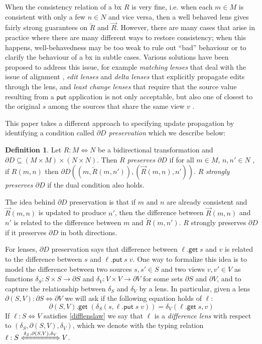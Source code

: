 \documentclass[acmsmall,review,anonymous]{acmart}\settopmatter{printfolios=true,printccs=false,printacmref=false}
\theoremstyle{definition}
\newtheorem{definition}{Definition}
\newcommand{\kw}[1]{\ensuremath{\mathsf{#1}}\xspace}
\newcommand{\get}{\ensuremath{\kw{get}}\xspace}
\newcommand{\pput}{\ensuremath{\kw{put}}\xspace}
\begin{document}
When the consistency relation of a bx $R$ is very fine, i.e. when each $m \in M$
is consistent with only a few $n \in N$ and vice versa, then a well behaved lens
gives fairly strong guarantees on $\overleftarrow{R}$ and $\overrightarrow{R}$.
However, there are many cases that arise in practice where there are many
different ways to restore consistency; when this happens, well-behavedness may
be too weak to rule out ``bad'' behaviour or to clarify the behaviour of a bx in
subtle cases. Various solutions have been proposed to address this issue, for
example {\em matching lenses} that deal with the issue of alignment
\cite{barbosa2010matching}, {\em edit lenses} \cite{hofmann2012edit} and {\em
delta lenses} \cite{diskin2011asymmetric,diskin2011state,pacheco2012delta}
that explicitly propagate edits through the lens, and {\em least change
lenses} that require that the source value resulting from a \pput application
is not only acceptable, but also one of closest to the original $s$ among the
sources that share the same view $v$ \cite{macedo2013composing}.

This paper takes a different approach to specifying update propagation by
identifying a condition called {\em $\partial D$ preservation} which we describe
below:
\begin{definition}
Let $R : M \Leftrightarrow N$ be a bidirectional transformation and $\partial D
\subseteq (M \times M) \times (N \times N)$. Then $R$ {\em preserves $\partial
D$} if for all $m \in M$, $n, n' \in N$ , if $R(m, n)$ then $\partial D((m,
\overleftarrow{R}(m, n')), (\overrightarrow{R}(m, n), n'))$. $R$ {\em
strongly preserves $\partial D$} if the dual condition also holds.
\end{definition}
\noindent The idea behind $\partial D$ preservation is that if $m$ and $n$ are
already consistent and $\overrightarrow{R}(m,n)$ is updated to produce $n'$,
then the difference between $\overrightarrow{R}(m,n)$ and $n'$ is related
to the difference between $m$ and $\overleftarrow{R}(m,n')$. $R$
strongly preserves $\partial D$ if it preserves $\partial D$ in both directions.

For lenses, $\partial D$ preservation says that difference between $\ell.\get \;
s$ and $v$ is related to the difference between $s$ and $\ell.\pput \; s \;
v$. One way to formalize this idea is to model the difference between two sources $s, s'
\in S$ and two views $v, v' \in V$ as functions $\delta_S : S \times S
\longrightarrow \partial S$ and $\delta_V : V \times V \longrightarrow \partial
V$ for some sets $\partial S$ and $\partial V$, and to capture the
relationship between $\delta_S$ and $\delta_V$ by a lens. In
particular, given a lens $\partial(S, V) : \partial S \Leftrightarrow \partial
V$ we will ask if the following equation holds of $\ell$:
\begin{equation}\label{difflenslaw}
\partial(S, V).\get \; (\delta_S(s, \ell.\pput \; s \; v)) = \delta_V(\ell.\get
\; s, v)
\end{equation}
If $\ell : S \Leftrightarrow V$ satisfies \cref{difflenslaw} we say that 
$\ell$ is a {\em difference  lens} with respect to $(\delta_S, 
\partial(S, V), \delta_V)$, which we denote with the typing relation 
$\ell : S \xLeftrightarrow{\delta_S, \partial(S, V), \delta_V} V$.
\end{document}
